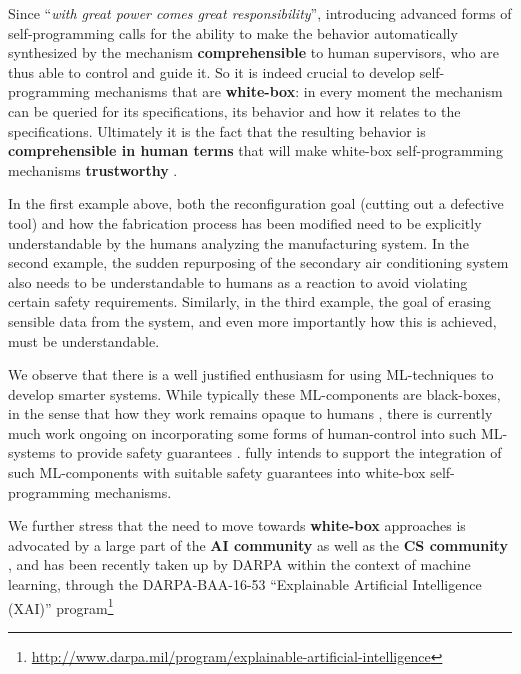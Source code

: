 Since ``\emph{with great power comes great responsibility}'',
introducing advanced forms of self-programming calls for the ability
to make the behavior automatically synthesized by the mechanism
\textbf{comprehensible} to human supervisors, who are thus able to control and guide it.
So it is indeed crucial to develop self-programming mechanisms that are \textbf{white-box}: in every moment the
mechanism can be queried for its specifications, its behavior and how
it relates to the specifications. Ultimately it is the fact that 
the resulting behavior is \textbf{comprehensible in human terms} that will make white-box self-programming mechanisms  \textbf{trustworthy} \cite{CaDa10,Neumann17}.
%


In the first example above, both the reconfiguration goal (cutting out
a defective tool) and how the fabrication process has been modified
need to be explicitly understandable by the humans analyzing the
manufacturing system.
In the second example, the sudden repurposing of the secondary air conditioning
system also needs to be understandable to humans as a reaction to
avoid violating certain safety requirements.
Similarly, in the third example, the goal of erasing sensible data
from the system, and even more importantly how this is achieved, must
be understandable.



We observe that there is a well justified enthusiasm for using ML-techniques
to develop smarter systems.  
%
While typically these ML-components are
black-boxes, in the sense that how they work remains opaque to humans
\cite{MnihKSGAWR13,SilverHMGSDSAPL16},
%
there is currently much work ongoing on incorporating some forms of
human-control into such ML-systems to provide safety guarantees
\cite{ML1,ML2,ML3}. 
%
\project fully intends to support the integration
of such ML-components with suitable safety guarantees into white-box
self-programming mechanisms.



We further stress that the need to move towards \textbf{white-box}
approaches is advocated by a large part of the \textbf{AI community}
\cite{RussellDT15} as well as the \textbf{CS community} \cite{ACMStatement07}, and has been recently taken up by DARPA within the
context of machine learning, through the DARPA-BAA-16-53 ``Explainable
Artificial Intelligence (XAI)''
program\footnote{\url{http://www.darpa.mil/program/explainable-artificial-intelligence}}

